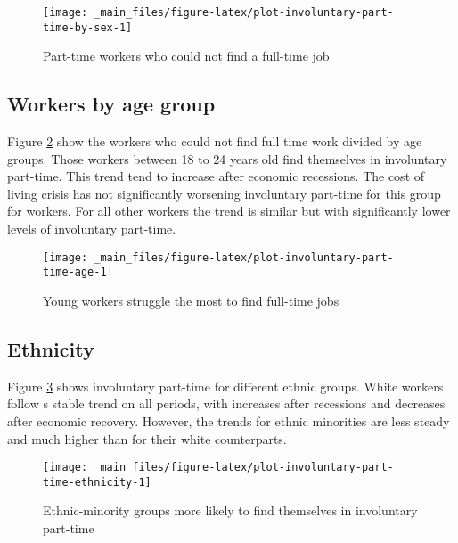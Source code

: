 \documentclass[
]{book}
\begin{document}
\begin{figure}

{\centering \texttt{[image: \_main\_files/figure-latex/plot-involuntary-part-time-by-sex-1]} 

}

\caption{Part-time workers who could not find a full-time job}\label{fig:plot-involuntary-part-time-by-sex}
\end{figure}

\hypertarget{workers-by-age-group}{%
\subsection{Workers by age group}\label{workers-by-age-group}}

Figure \ref{fig:plot-involuntary-part-time-age} show the workers who could not find full time work divided by age groups. Those workers between 18 to 24 years old find themselves in involuntary part-time. This trend tend to increase after economic recessions. The cost of living crisis has not significantly worsening involuntary part-time for this group for workers. For all other workers the trend is similar but with significantly lower levels of involuntary part-time.

\begin{figure}

{\centering \texttt{[image: \_main\_files/figure-latex/plot-involuntary-part-time-age-1]} 

}

\caption{Young workers struggle the most to find full-time jobs}\label{fig:plot-involuntary-part-time-age}
\end{figure}

\hypertarget{ethnicity}{%
\subsection{Ethnicity}\label{ethnicity}}

Figure \ref{fig:plot-involuntary-part-time-ethnicity} shows involuntary part-time for different ethnic groups. White workers follow s stable trend on all periods, with increases after recessions and decreases after economic recovery. However, the trends for ethnic minorities are less steady and much higher than for their white counterparts.

\begin{figure}

{\centering \texttt{[image: \_main\_files/figure-latex/plot-involuntary-part-time-ethnicity-1]} 

}

\caption{Ethnic-minority groups more likely to find themselves in involuntary part-time}\label{fig:plot-involuntary-part-time-ethnicity}
\end{figure}
\end{document}
